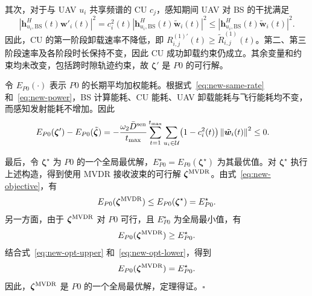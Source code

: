 \documentclass[11pt,a4paper]{ctexart}
\begin{document}
其次，对于与 UAV $u_i$ 共享频谱的 CU $c_j$，感知期间 UAV 对 BS 的干扰满足
\begin{equation}\label{eq:new-interference}
\left|\bm h_{u_i,\mathrm{BS}}^H(t)\bm w'_i(t)\right|^2
=c_i^2(t)\left|\bm h_{u_i,\mathrm{BS}}^H(t)\tilde{\bm w}_i(t)\right|^2
\le\left|\bm h_{u_i,\mathrm{BS}}^H(t)\tilde{\bm w}_i(t)\right|^2.
\end{equation}
因此，CU 的第一阶段卸载速率不降低，即 $R_{i,j}^{(1)\prime}(t)\ge\tilde R_{i,j}^{(1)}(t)$。第二、第三阶段速率及各阶段时长保持不变，因此 CU 成功卸载约束仍成立。其余变量和约束均未改变，包括跨时隙轨迹约束，故 $\bm\zeta'$ 是 $P0$ 的可行解。

令 $E_{P0}(\cdot)$ 表示 $P0$ 的长期平均加权能耗。根据式~\eqref{eq:new-same-rate} 和~\eqref{eq:new-power}，BS 计算能耗、CU 能耗、UAV 卸载能耗与飞行能耗均不变，而感知发射能耗不增加。因此
\begin{align}\label{eq:new-objective}
E_{P0}(\bm\zeta')-E_{P0}(\tilde{\bm\zeta})
&=-\frac{\omega_2\bar D^{\rm sen}}{t_{\max}}
\sum_{t=1}^{t_{\max}}\sum_{u_i\in\mathcal U}
\bigl(1-c_i^2(t)\bigr)\left\|\tilde{\bm w}_i(t)\right\|^2
\le0.
\end{align}

最后，令 $\bm\zeta^\star$ 为 $P0$ 的一个全局最优解，$E_{P0}^\star=E_{P0}(\bm\zeta^\star)$ 为其最优值。对 $\bm\zeta^\star$ 执行上述构造，得到使用 MVDR 接收波束的可行解 $\bm\zeta^{\rm MVDR}$。由式~\eqref{eq:new-objective}，有
\begin{equation}\label{eq:new-opt-upper}
E_{P0}(\bm\zeta^{\rm MVDR})\le E_{P0}(\bm\zeta^\star)=E_{P0}^\star.
\end{equation}
另一方面，由于 $\bm\zeta^{\rm MVDR}$ 对 $P0$ 可行，且 $E_{P0}^\star$ 为全局最小值，有
\begin{equation}\label{eq:new-opt-lower}
E_{P0}(\bm\zeta^{\rm MVDR})\ge E_{P0}^\star.
\end{equation}
结合式~\eqref{eq:new-opt-upper} 和~\eqref{eq:new-opt-lower}，得到
\begin{equation}
E_{P0}(\bm\zeta^{\rm MVDR})=E_{P0}^\star.
\end{equation}
因此，$\bm\zeta^{\rm MVDR}$ 是 $P0$ 的一个全局最优解，定理得证。\hfill$\square$
\end{document}
